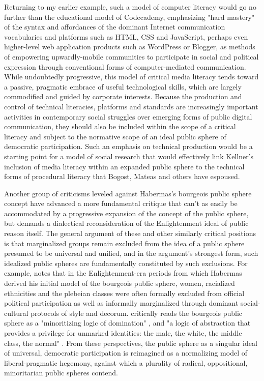 Returning to my earlier example, such a model of computer literacy would go no further than the educational model of Codecademy, emphasizing "hard mastery" of the syntax and affordances of the dominant Internet communication vocabularies and platforms such as HTML, CSS and JavaScript, perhaps even higher-level web application products such as WordPress or Blogger, as methods of empowering upwardly-mobile communities to participate in social and political expression through conventional forms of computer-mediated communication. While undoubtedly progressive, this model of critical media literacy tends toward a passive, pragmatic embrace of useful technological skills, which are largely commodified and guided by corporate interests. Because the production and control of technical literacies, platforms and standards are increasingly important activities in contemporary social struggles over emerging forms of public digital communication, they should also be included within the scope of a critical literacy and subject to the normative scope of an ideal public sphere of democratic participation. Such an emphasis on technical production would be a starting point for a model of social research that would effectively link Kellner's inclusion of media literacy within an expanded public sphere to the technical forms of procedural literacy that Bogost, Mateas and others have espoused.

Another group of criticisms leveled against Habermas's bourgeois public sphere concept \autocites[e.g.,][]{Negt93}{Fraser90}{Warner92} have advanced a more fundamental critique that can't as easily be accommodated by a progressive expansion of the concept of the public sphere, but demands a dialectical reconsideration of the Enlightenment ideal of public reason itself. The general argument of these and other similarly critical positions is that marginalized groups remain excluded from the idea of a public sphere presumed to be universal and unified, and in the argument's strongest form, such idealized public spheres are fundamentally constituted by such exclusions. For example, \citeauthor{Fraser90} notes that in the Enlightenment-era periods from which Habermas derived his initial model of the bourgeois public sphere, women, racialized ethnicities and the plebeian classes were often formally excluded from official political participation as well as informally marginalized through dominant social-cultural protocols of style and decorum. \citeauthor{Warner92} critically reads the bourgeois public sphere as a "minoritizing logic of domination" \autocite[384]{Warner92}, and "a logic of abstraction that provides a privilege for unmarked identities: the male, the white, the middle class, the normal" \autocite[383]{Warner92}. From these perspectives, the public sphere as a singular ideal of universal, democratic participation is reimagined as a normalizing model of liberal-pragmatic hegemony, against which a plurality of radical, oppositional, minoritarian public spheres contend.

